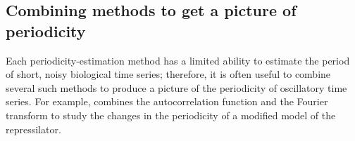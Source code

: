 \subsection{Combining methods to get a picture of periodicity}
\label{subsec:analysis-characterisation-combined}

Each periodicity-estimation method has a limited ability to estimate the period of short, noisy biological time series; therefore, it is often useful to combine several such methods to produce a picture of the periodicity of oscillatory time series.
For example, \textcite{potvin-trottierSynchronousLongtermOscillations2016} combines the autocorrelation function and the Fourier transform to study the changes in the periodicity of a modified model of the repressilator.


